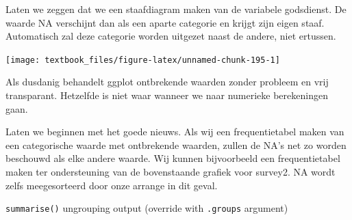 \documentclass[]{tufte-book}
\newenvironment{Shaded}{}{}
\newcommand{\DataTypeTok}[1]{\textcolor[rgb]{0.56,0.13,0.00}{#1}}
\newcommand{\KeywordTok}[1]{\textcolor[rgb]{0.00,0.44,0.13}{\textbf{#1}}}
\newcommand{\NormalTok}[1]{#1}
\newcommand{\OperatorTok}[1]{\textcolor[rgb]{0.40,0.40,0.40}{#1}}
\newcommand{\StringTok}[1]{\textcolor[rgb]{0.25,0.44,0.63}{#1}}
\begin{document}
Laten we zeggen dat we een staafdiagram maken van de variabele godsdienst. De waarde NA verschijnt dan als een aparte categorie en krijgt zijn eigen staaf. Automatisch zal deze categorie worden uitgezet naast de andere, niet ertussen.

\begin{Shaded}
\end{Shaded}

\texttt{[image: textbook\_files/figure-latex/unnamed-chunk-195-1]}

Als dusdanig behandelt ggplot ontbrekende waarden zonder probleem en vrij transparant. Hetzelfde is niet waar wanneer we naar numerieke berekeningen gaan.

Laten we beginnen met het goede nieuws. Als wij een frequentietabel maken van een categorische waarde met ontbrekende waarden, zullen de NA's net zo worden beschouwd als elke andere waarde. Wij kunnen bijvoorbeeld een frequentietabel maken ter ondersteuning van de bovenstaande grafiek voor survey2. NA wordt zelfs meegesorteerd door onze arrange in dit geval.

\begin{Shaded}
\end{Shaded}

\texttt{summarise()} ungrouping output (override with \texttt{.groups} argument)
\end{document}
